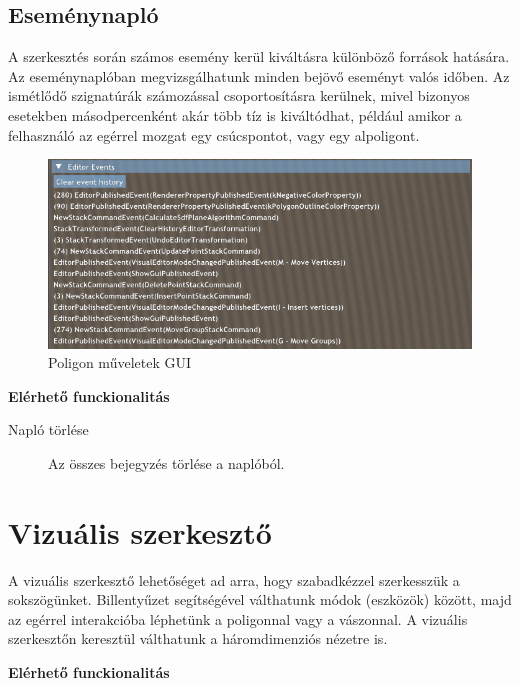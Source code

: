 \subsection{Eseménynapló}

A szerkesztés során számos esemény kerül kiváltásra különböző források hatására. Az eseménynaplóban megvizsgálhatunk minden bejövő eseményt valós időben. Az ismétlődő szignatúrák számozással csoportosításra kerülnek, mivel bizonyos esetekben másodpercenként akár több tíz is kiváltódhat, például amikor a felhasználó az egérrel mozgat egy csúcspontot, vagy egy alpoligont.

\begin{figure}[H]
    \centering
    \includegraphics[width=1\linewidth]{images/editor_events.png}
    \caption{Poligon műveletek GUI}
    \label{fig:editor_events-1}
\end{figure}

\textbf{Elérhető funckionalitás}

\begin{description}
    \item[Napló törlése] Az összes bejegyzés törlése a naplóból.
\end{description}

\section{Vizuális szerkesztő}\label{sec:visual_editor}

A vizuális szerkesztő lehetőséget ad arra, hogy szabadkézzel szerkesszük a sokszögünket. Billentyűzet segítségével válthatunk módok (eszközök) között, majd az egérrel interakcióba léphetünk a poligonnal vagy a vászonnal. A vizuális szerkesztőn keresztül válthatunk a háromdimenziós nézetre is.

\textbf{Elérhető funckionalitás}

